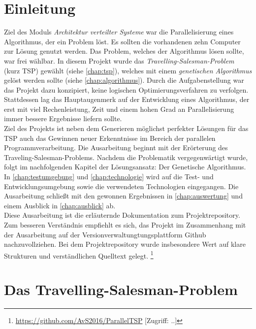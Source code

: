 \documentclass[12pt,a4paper]{scrreprt}
\newcommand{\absatz}{\\[12pt]}
\newcommand{\heute}{\the\day.\the\month.\the\year}
\begin{document}


\tableofcontents

\setlength{\parindent}{0pt}

\chapter{Einleitung}
\label{chap:einleitung}

Ziel des Moduls \textit{Architektur verteilter Systeme} war die Parallelisierung eines Algorithmus, der ein Problem löst. Es sollten die vorhandenen zehn Computer zur Lösung genutzt werden. Das Problem, welches der Algorithmus lösen sollte, war frei wählbar. In diesem Projekt wurde das \textit{Travelling-Salesman-Problem} (kurz TSP) gewählt (siehe \autoref{chap:tsp}), welches mit einem \textit{genetischen Algorithmus} gelöst werden sollte (siehe \autoref{chap:algorithmus}). Durch die Aufgabenstellung war das Projekt dazu konzipiert, keine logischen Optimierungsverfahren zu verfolgen. Stattdessen lag das Hauptaugenmerk auf der Entwicklung eines Algorithmus, der erst mit viel Rechenleistung, Zeit und einem hohen Grad an Parallelisierung immer bessere Ergebnisse liefern sollte.\absatz
Ziel des Projekts ist neben dem Generieren möglichst perfekter Lösungen für das TSP auch das Gewinnen neuer Erkenntnisse im Bereich der parallelen Programmverarbeitung. Die Ausarbeitung beginnt mit der Erörterung des Traveling-Salesman-Problems. Nachdem die Problematik vergegenwärtigt wurde, folgt im nachfolgenden Kapitel der Lösungsansatz: Der Genetische Algorithmus. In \autoref{chap:testumgebung} und \autoref{chap:technologie} wird auf die Test- und Entwicklungsumgebung sowie die verwendeten Technologien eingegangen. Die Ausarbeitung schließt mit den gewonnen Ergebnissen in \autoref{chap:auswertung} und einem Ausblick in \autoref{chap:ausblick} ab.\absatz
Diese Ausarbeitung ist die erläuternde Dokumentation zum Projektrepository. Zum besseren Verständnis empfiehlt es sich, das Projekt im Zusammenhang mit der Ausarbeitung auf der Versionverwaltungtungsplattform Github nachzuvollziehen. Bei dem Projektrepository wurde insbesondere Wert auf klare Strukturen und verständlichen Quelltext gelegt.  \footnote{\url{https://github.com/AvS2016/ParallelTSP} [Zugriff: \heute]}

\chapter{Das Travelling-Salesman-Problem}
\label{chap:tsp}
\end{document}
